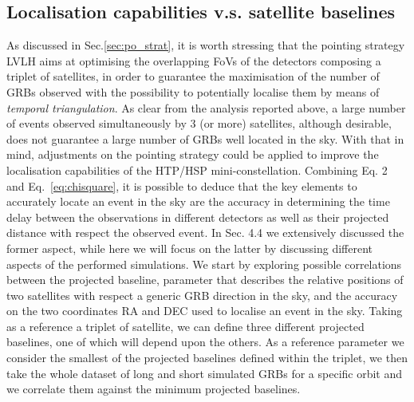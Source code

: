 \documentclass[]{spie}  %
\begin{document}
\subsection{Localisation capabilities v.s. satellite baselines}
As discussed in Sec.\ref{sec:po_strat}, it is worth stressing that the pointing strategy LVLH aims at optimising the overlapping FoVs of the detectors composing a triplet of satellites, in order to guarantee the maximisation of the number of GRBs observed with the possibility to potentially localise them by means of \emph{temporal triangulation}. As clear from the analysis reported above, a large number of events observed simultaneously by 3 (or more) satellites, although desirable, does not guarantee a large number of GRBs well located in the sky. With that in mind, adjustments on the pointing strategy could be applied to improve the localisation capabilities of the HTP/HSP mini-constellation.
Combining Eq. 2 and Eq.~\ref{eq:chisquare}, it is possible to deduce that the key elements to accurately locate an event in the sky are the accuracy in determining the time delay between the observations in different detectors as well as their projected distance with respect the observed event. In Sec. 4.4 we extensively discussed the former aspect, while here we will focus on the latter by discussing different aspects of the performed simulations. We start by exploring possible correlations between the projected baseline, parameter that describes the relative positions of two satellites with respect a generic GRB direction in the sky, and the accuracy on the two coordinates RA and DEC used to localise an event in the sky. Taking as a reference a triplet of satellite, we can define three different projected baselines, one of which will depend upon the others. As a reference parameter we consider the smallest of the projected baselines defined within the triplet, we then take the whole dataset of long and short simulated GRBs for a specific orbit and we correlate them against the minimum projected baselines. 
\end{document}
